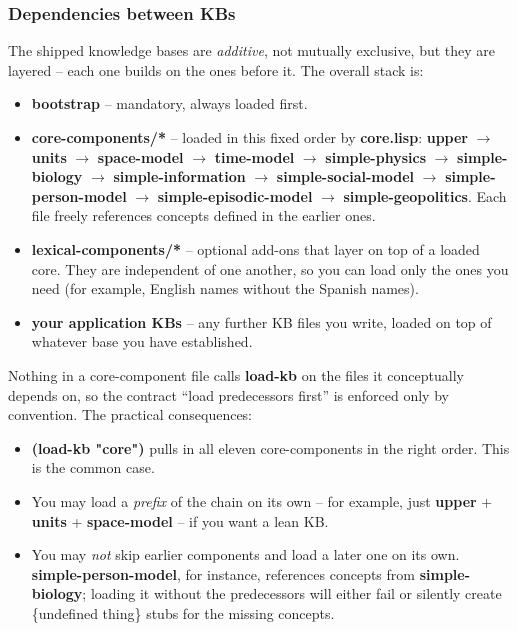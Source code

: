 \documentclass[titlepage,twoside,openright,11pt]{article}
\begin{document}
\subsubsection*{Dependencies between KBs}

The shipped knowledge bases are \emph{additive}, not mutually
exclusive, but they are layered -- each one builds on the ones before
it. The overall stack is:

\begin{itemize}
\item
  \textbf{bootstrap} -- mandatory, always loaded first.
\item
  \textbf{core-components/*} -- loaded in this fixed order by
  \textbf{core.lisp}:
  \textbf{upper} $\rightarrow$ \textbf{units} $\rightarrow$
  \textbf{space-model} $\rightarrow$ \textbf{time-model} $\rightarrow$
  \textbf{simple-physics} $\rightarrow$ \textbf{simple-biology}
  $\rightarrow$ \textbf{simple-information} $\rightarrow$
  \textbf{simple-social-model} $\rightarrow$
  \textbf{simple-person-model} $\rightarrow$
  \textbf{simple-episodic-model} $\rightarrow$
  \textbf{simple-geopolitics}.
  Each file freely references concepts defined in the earlier ones.
\item
  \textbf{lexical-components/*} -- optional add-ons that layer on top
  of a loaded core. They are independent of one another, so you can
  load only the ones you need (for example, English names without the
  Spanish names).
\item
  \textbf{your application KBs} -- any further KB files you write,
  loaded on top of whatever base you have established.
\end{itemize}

Nothing in a core-component file calls \textbf{load-kb} on the files
it conceptually depends on, so the contract ``load predecessors first''
is enforced only by convention. The practical consequences:

\begin{itemize}
\item
  \textbf{(load-kb "core")} pulls in all eleven core-components in the
  right order. This is the common case.
\item
  You may load a \emph{prefix} of the chain on its own -- for example,
  just \textbf{upper} + \textbf{units} + \textbf{space-model} -- if you
  want a lean KB.
\item
  You may \emph{not} skip earlier components and load a later one on
  its own. \textbf{simple-person-model}, for instance, references
  concepts from \textbf{simple-biology}; loading it without the
  predecessors will either fail or silently create \{undefined thing\}
  stubs for the missing concepts.
\end{itemize}
\end{document}
